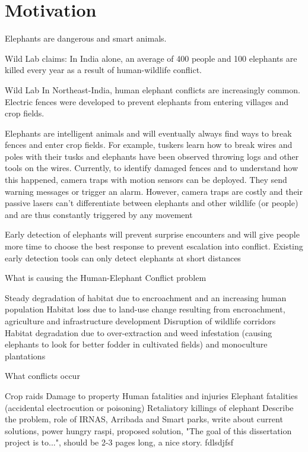 \section{ Motivation}

Elephants are dangerous and smart animals.\cite{scientificelephant}

Wild Lab claims:
In India alone, an average of 400 people and 100 elephants are killed every year as a result of human-wildlife conflict. 

Wild Lab
In Northeast-India, human elephant conflicts are increasingly common. Electric fences were developed to prevent elephants from entering villages and crop fields.

Elephants are intelligent animals and will eventually always find ways to break fences and enter crop fields. For example, tuskers learn how to break wires and poles with their tusks and elephants have been observed throwing logs and other tools on the wires.  Currently, to identify damaged fences and to understand how this happened, camera traps with motion sensors can be deployed. They send warning messages or trigger an alarm. However, camera traps are costly and their passive lasers can’t differentiate between elephants and other wildlife (or people) and are thus constantly triggered by any movement

Early detection of elephants will prevent surprise encounters and will give people more time to choose the best response to prevent escalation into conflict. Existing early detection tools can only detect elephants at short distances


What is causing the Human-Elephant Conflict problem

    Steady degradation of habitat due to encroachment and an increasing human population
    Habitat loss due to land-use change resulting from encroachment, agriculture and infrastructure development
    Disruption of wildlife corridors
    Habitat degradation due to over-extraction and weed infestation (causing elephants to look for better fodder in cultivated fields) and monoculture plantations

What conflicts occur

    Crop raids
    Damage to property
    Human fatalities and injuries
    Elephant fatalities (accidental electrocution or poisoning)
    Retaliatory killings of elephant
        Describe the problem, role of IRNAS, Arribada and Smart parks, write about current solutions, power hungry raspi, proposed solution, "The goal of this dissertation project is to...", should be 2-3 pages long, a nice story.
fdlsdjfsf
